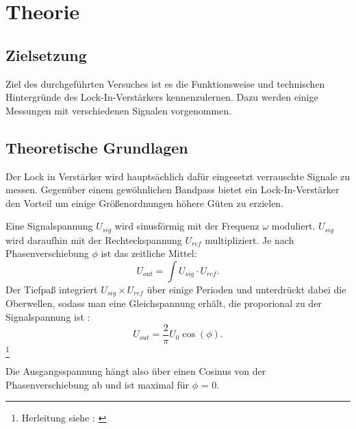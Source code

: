 \section{Theorie}
\label{sec:Theorie}
\subsection{Zielsetzung}
\label{sec:Zielsetzung}
Ziel des durchgeführten Versuches ist es die Funktionsweise und technischen
Hintergründe des Lock-In-Verstärkers kennenzulernen. Dazu werden einige
Messungen mit verschiedenen Signalen vorgenommen.

\subsection{Theoretische Grundlagen}
\label{sec:Grundlagen}
Der Lock in Verstärker wird hauptsächlich dafür eingesetzt verrauschte Signale
zu messen. Gegenüber einem gewöhnlichen Bandpass bietet ein Lock-In-Verstärker
den Vorteil um einige Größenordnungen höhere Güten zu erzielen.

Eine Signalspannung $U_{sig}$ wird sinusförmig mit der Frequenz $\omega$
moduliert. $U_{sig}$ wird daraufhin mit der Rechteckspannung $U_{ref}$
multipliziert. Je nach Phasenverschiebung $\phi$ ist das zeitliche Mittel:
\begin{equation}
U_{out} = \int U_{sig} \cdot U_{ref} .
\label{eqn:Uout2}
\end{equation}
Der Tiefpaß integriert $U_{sig} \times U_{ref}$ über einige Perioden und
unterdrückt dabei die Oberwellen, sodass man eine Gleichspannung erhält, die
proporional zu der Signalspannung
ist :
\begin{equation}
U_{out} = \frac{2}{\pi} U_0 \cos(\phi).
\label{eqn:Uout}
\end{equation}
\footnote{Herleitung siehe : \cite[1-3]{Anleitung}}

Die Ausgangsspannung hängt also über einen Cosinus
von der Phasenverschiebung ab und ist maximal
für $\phi$ = 0.
